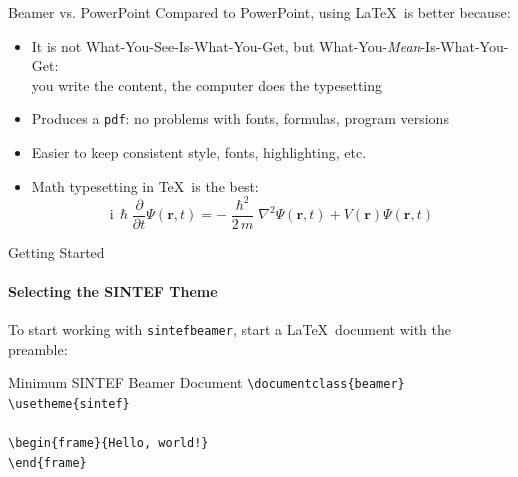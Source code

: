 \begin{frame}{Beamer vs. PowerPoint}
Compared to PowerPoint, using \LaTeX\ is better because:
\begin{itemize}
\item It is not What-You-See-Is-What-You-Get, but
What-You-\emph{Mean}-Is-What-You-Get:\\
you write the content, the computer does the typesetting
\item Produces a \texttt{pdf}: no problems with fonts, formulas,
      program versions
\item Easier to keep consistent style, fonts, highlighting, etc.
\item Math typesetting in \TeX\ is the best:
\begin{equation*}
\mathrm{i}\,\hslash\frac{\partial}{\partial t} \Psi(\mathbf{r},t) =
-\frac{\hslash^2}{2\,m}\nabla^2\Psi(\mathbf{r},t)
+ V(\mathbf{r})\Psi(\mathbf{r},t)
\end{equation*}

\end{itemize}
\end{frame}

\begin{frame}[fragile]{Getting Started}
\framesubtitle{Selecting the SINTEF Theme}
To start working with \texttt{sintefbeamer}, start a \LaTeX\ document with the
preamble:
\begin{block}{Minimum SINTEF Beamer Document}
\verb|\documentclass{beamer}|\\
\verb|\usetheme{sintef}|\\
\verb||\\
\verb|\begin{frame}{Hello, world!}|\\
\verb|\end{frame}|\\
\verb||\\
\end{block}
\end{frame}

